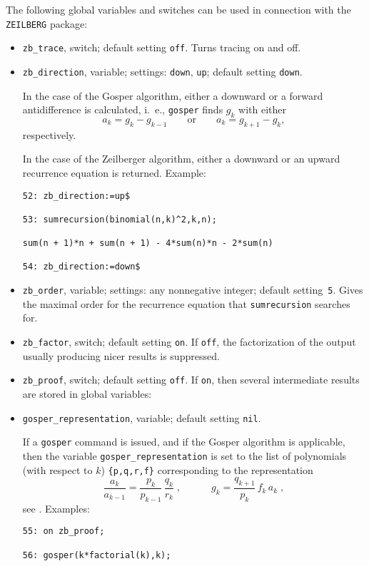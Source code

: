 The following global variables and switches can be used in connection with
the {\tt ZEILBERG} package:
\begin{itemize}
\item
{\tt zb\_trace}, switch; default setting {\tt off}. 
Turns tracing on and off.
\item
{\tt zb\_direction}, variable; settings: {\tt down}, {\tt up};
default setting {\tt down}. 

In the case of the Gosper algorithm, either a downward or a forward
antidifference is calculated, i.\ e., {\tt gosper} finds $g_k$ with either
\[
a_k=g_k-g_{k-1}
\quad\quad\mbox{or}\quad\quad
a_k=g_{k+1}-g_{k},
\]
respectively.

In the case of the Zeilberger algorithm, either a downward or an upward
recurrence equation is returned. Example:

{\small
\begin{verbatim}
52: zb_direction:=up$

53: sumrecursion(binomial(n,k)^2,k,n);

sum(n + 1)*n + sum(n + 1) - 4*sum(n)*n - 2*sum(n)

54: zb_direction:=down$
\end{verbatim}
}\noindent
\item
{\tt zb\_order}, variable; settings: any nonnegative integer;
default setting~{\tt 5}. 
Gives the maximal order for the recurrence
equation that {\tt sumrecursion} searches for.
\item
{\tt zb\_factor}, switch; default setting {\tt on}.
If {\tt off}, the factorization of the output usually producing nicer results
is suppressed.
\item
{\tt zb\_proof}, switch; default setting {\tt off}. If {\tt on},
then several intermediate results are stored in global variables:
\item
{\tt gosper\_representation}, variable; default setting {\tt nil}.

If a {\tt gosper} command is issued, and if the Gosper algorithm is applicable,
then the variable {\tt gosper\_representation} is set to the
list of polynomials (with respect to $k$) {\tt \{p,q,r,f\}}
corresponding to the representation
\[
\frac{a_k}{a_{k-1}}=\frac{p_k}{p_{k-1}}\,\frac{q_k}{r_k}
\;,
\quad\quad\quad
g_k=\frac{q_{k+1}}{p_k}\,f_k\,a_k
\;,
\]
see \cite{Gos}. Examples:

{\small
\begin{verbatim}
55: on zb_proof;

56: gosper(k*factorial(k),k);


\end{verbatim}}
\end{itemize}
